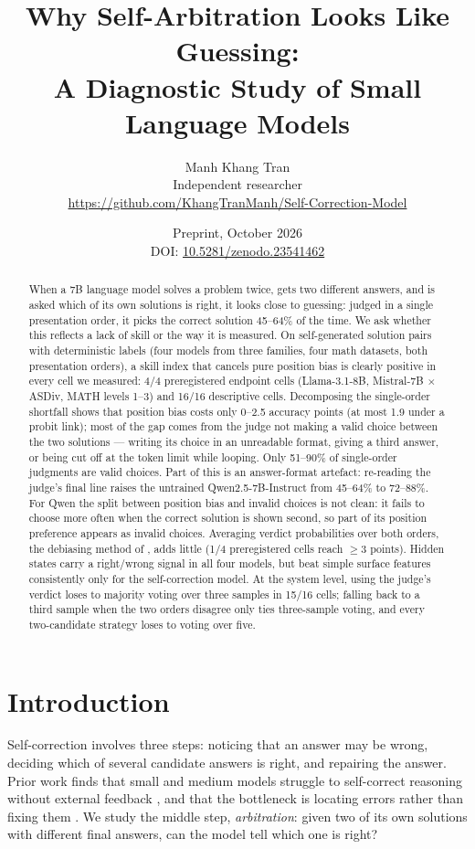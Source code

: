 \documentclass[11pt]{article}
\title{Why Self-Arbitration Looks Like Guessing:\\A Diagnostic Study of Small Language Models}
\author{Manh Khang Tran\\Independent researcher\\[2pt]
\small\url{https://github.com/KhangTranManh/Self-Correction-Model}}
\date{Preprint, October 2026\\[2pt]
\small DOI: \href{https://doi.org/10.5281/zenodo.23541462}{10.5281/zenodo.23541462}}
\begin{document}
\maketitle

\begin{abstract}
When a 7B language model solves a problem twice, gets two different answers, and is asked which of its own
solutions is right, it looks close to guessing: judged in a single presentation order, it picks the correct
solution 45--64\% of the time. We ask whether this reflects a lack of skill or the way it is measured. On
self-generated solution pairs with deterministic labels (four models from three families, four math datasets,
both presentation orders), a skill index that cancels pure position bias is clearly positive in every cell we
measured: 4/4 preregistered endpoint cells (Llama-3.1-8B, Mistral-7B $\times$ ASDiv, MATH levels 1--3) and
16/16 descriptive cells. Decomposing the single-order shortfall shows that position bias costs only 0--2.5
accuracy points (at most 1.9 under a probit link); most of the gap comes from the judge not making a valid
choice between the two solutions --- writing its choice in an unreadable format, giving a third answer, or
being cut off at the token limit while looping. Only 51--90\% of single-order judgments are valid choices. Part of this is an
answer-format artefact: re-reading the judge's final line raises the untrained Qwen2.5-7B-Instruct from
45--64\% to 72--88\%. For Qwen the split between position bias and invalid choices is not clean: it fails to
choose more often when the correct solution is shown second, so part of its position preference appears as
invalid choices. Averaging verdict probabilities over both orders, the debiasing method of
\citet{ren2023selfeval}, adds little (1/4 preregistered cells reach $\geq$3 points). Hidden states carry a
right/wrong signal in all four models, but beat simple surface features consistently only for the
self-correction model. At the system level, using the judge's verdict loses to majority voting over three
samples in 15/16 cells; falling back to a third sample when the two orders disagree only ties three-sample
voting, and every two-candidate strategy loses to voting over five.
\end{abstract}

\section{Introduction}
Self-correction involves three steps: noticing that an answer may be wrong, deciding which of several
candidate answers is right, and repairing the answer. Prior work finds that small and medium models struggle
to self-correct reasoning without external feedback \citep{huang2023cannot}, and that the bottleneck is
locating errors rather than fixing them \citep{tyen2024find}. We study the middle step, \emph{arbitration}:
given two of its own solutions with different final answers, can the model tell which one is right?
\end{document}
